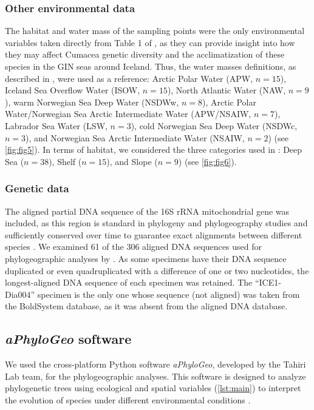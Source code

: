 \subsubsection{Other environmental data}
The habitat and water mass of the sampling points were the only environmental variables taken directly from Table 1 of \citep{uhlir_adding_2021}, as they can provide insight into how they may affect Cumacea genetic diversity and the acclimatization of these species in the GIN seas around Iceland. Thus, the water masses definitions, as described in \citep{uhlir_adding_2021}, were used as a reference: Arctic Polar Water (APW, $n=15$), Iceland Sea Overflow Water (ISOW, $n=15$), North Atlantic Water (NAW, $n=9$), warm Norwegian Sea Deep Water (NSDWw, $n=8$), Arctic Polar Water/Norwegian Sea Arctic Intermediate Water (APW/NSAIW, $n=7$), Labrador Sea Water (LSW, $n=3$), cold Norwegian Sea Deep Water (NSDWc, $n=3$), and Norwegian Sea Arctic Intermediate Water (NSAIW, $n=2$) (see \autoref{fig:fig5}). In terms of habitat, we considered the three categories used in \citep{uhlir_adding_2021}: Deep Sea ($n=38$), Shelf ($n=15$), and Slope ($n=9$) (see \autoref{fig:fig6}).

\subsubsection{Genetic data}
The aligned partial DNA sequence of the 16S rRNA mitochondrial gene was included, as this region is standard in phylogeny and phylogeography studies \citep{hugenholtz1998impact} and sufficiently conserved over time to guarantee exact alignments between different species \citep{saccone1999evolutionary}. We examined 61 of the 306 aligned DNA sequences used for phylogeographic analyses by \citep{uhlir_adding_2021}. As some specimens have their DNA sequence duplicated or even quadruplicated with a difference of one or two nucleotides, the longest-aligned DNA sequence of each specimen was retained. The ``ICE1-Dia004'' specimen is the only one whose sequence (not aligned) was taken from the BoldSystem database, as it was absent from the \citep{uhlir_adding_2021} aligned DNA database.

\subsection{{\textit{aPhyloGeo} software}\label{aPhyloGeo-software}}
We used the cross-platform Python software \textit{aPhyloGeo}, developed by the Tahiri Lab team, for the phylogeographic analyses. This software is designed to analyze phylogenetic trees using ecological and spatial variables (\autoref{lst:main}) to interpret the evolution of species under different environmental conditions \citep{koshkarov_phylogeography_2022, li2023aphylogeo, li2024host}.

